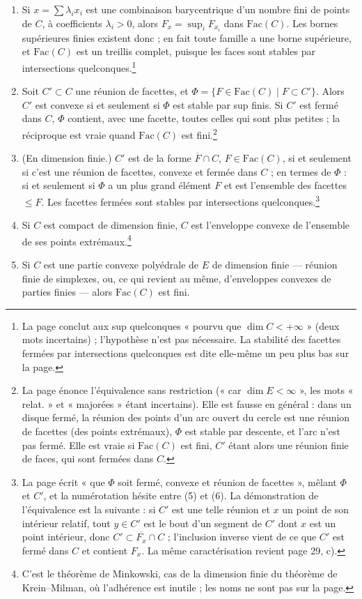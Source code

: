 \documentclass[11pt,a4paper]{article}
\begin{document}
\begin{enumerate}
\item[(4)] Si $x = \sum \lambda_{i} x_{i}$ est une combinaison barycentrique
d'un nombre fini de points de $C$, à coefficients $\lambda_{i} > 0$, alors
$F_{x} = \sup_{i} F_{x_{i}}$ dans $\mathrm{Fac}(C)$. Les bornes supérieures
finies existent donc ; en fait toute famille a une borne supérieure, et
$\mathrm{Fac}(C)$ est un treillis complet, puisque les faces sont stables par
intersections quelconques.\footnote{La page conclut aux sup quelconques
« pourvu que $\dim C < +\infty$ » (deux mots incertains) ; l'hypothèse n'est
pas nécessaire. La stabilité des facettes fermées par intersections
quelconques est dite elle-même un peu plus bas sur la page.}
\item[(5)] Soit $C' \subset C$ une réunion de facettes, et
$\Phi = \{F \in \mathrm{Fac}(C) \mid F \subset C'\}$. Alors $C'$ est convexe si
et seulement si $\Phi$ est stable par sup finis. Si $C'$ est fermé dans $C$,
$\Phi$ contient, avec une facette, toutes celles qui sont plus petites ; la
réciproque est vraie quand $\mathrm{Fac}(C)$ est fini.\footnote{La page énonce
l'équivalence sans restriction (« car $\dim E < \infty$ », les mots « relat. »
et « majorées » étant incertains). Elle est fausse en général : dans un disque
fermé, la réunion des points d'un arc ouvert du cercle est une réunion de
facettes (des points extrémaux), $\Phi$ est stable par descente, et l'arc n'est
pas fermé. Elle est vraie si $\mathrm{Fac}(C)$ est fini, $C'$ étant alors une
réunion finie de faces, qui sont fermées dans $C$.}
\item[(6)] (En dimension finie.) $C'$ est de la forme $\overline{F} \cap C$,
$F \in \mathrm{Fac}(C)$, si et seulement si c'est une réunion de facettes,
convexe et fermée dans $C$ ; en termes de $\Phi$ : si et seulement si $\Phi$ a
un plus grand élément $F$ et est l'ensemble des facettes $\leq F$. Les facettes
fermées sont stables par intersections quelconques.\footnote{La page écrit
« que $\Phi$ soit fermé, convexe et réunion de facettes », mêlant $\Phi$ et
$C'$, et la numérotation hésite entre (5) et (6). La démonstration de
l'équivalence est la suivante : si $C'$ est une telle réunion et $x$ un point de
son intérieur relatif, tout $y \in C'$ est le bout d'un segment de $C'$ dont $x$
est un point intérieur, donc $C' \subset \overline{F_{x}} \cap C$ ; l'inclusion
inverse vient de ce que $C'$ est fermé dans $C$ et contient $F_{x}$. La même
caractérisation revient page 29, c).}
\item[(7)] Si $C$ est compact de dimension finie, $C$ est l'enveloppe convexe de
l'ensemble de ses points extrémaux.\footnote{C'est le théorème de Minkowski,
cas de la dimension finie du théorème de Krein--Milman, où l'adhérence est
inutile ; les noms ne sont pas sur la page.}
\item[(8)] Si $C$ est une partie convexe polyédrale de $E$ de dimension finie
--- réunion finie de simplexes, ou, ce qui revient au même, d'enveloppes
convexes de parties finies --- alors $\mathrm{Fac}(C)$ est fini.
\end{enumerate}
\end{document}
